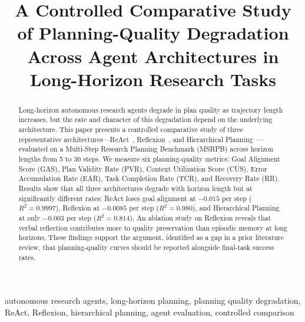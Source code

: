 \documentclass[conference]{IEEEtran}
\begin{document}
\title{A Controlled Comparative Study of Planning-Quality Degradation\\
Across Agent Architectures in Long-Horizon Research Tasks}

\author{%
}

\maketitle

\begin{abstract}
Long-horizon autonomous research agents degrade in plan quality as trajectory
length increases, but the rate and character of this degradation depend on the
underlying architecture. This paper presents a controlled comparative study of
three representative architectures---ReAct~\cite{yao2023react},
Reflexion~\cite{shinn2023reflexion}, and Hierarchical
Planning~\cite{aghzal2026hierarchical,tan2026coarse}---evaluated on a
Multi-Step Research Planning Benchmark (MSRPB) across horizon lengths from 5
to 30 steps. We measure six planning-quality metrics: Goal Alignment Score
(GAS), Plan Validity Rate (PVR), Context Utilization Score (CUS), Error
Accumulation Rate (EAR), Task Completion Rate (TCR), and Recovery Rate (RR).
Results show that all three architectures degrade with horizon length but at
significantly different rates: ReAct loses goal alignment at $-0.015$ per step
($R^{2}=0.9997$), Reflexion at $-0.0085$ per step ($R^{2}=0.980$), and
Hierarchical Planning at only $-0.003$ per step ($R^{2}=0.814$). An ablation
study on Reflexion reveals that verbal reflection contributes more to quality
preservation than episodic memory at long horizons. These findings support the
argument, identified as a gap in a prior literature review, that
planning-quality curves should be reported alongside final-task success rates.
\end{abstract}

\begin{IEEEkeywords}
autonomous research agents, long-horizon planning, planning quality degradation,
ReAct, Reflexion, hierarchical planning, agent evaluation, controlled comparison
\end{IEEEkeywords}
\end{document}
